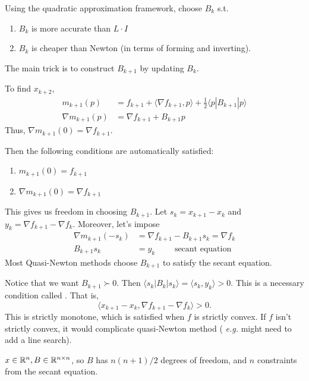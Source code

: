 \documentclass[class=article,crop=false]{standalone}
\begin{document}
\begin{thm}
Using the quadratic approximation framework, choose $ B_k$ s.t. 
\begin{enumerate}[label=(\arabic*)]
	\item $ B_k$ is more accurate than $ L \cdot I$
	\item $ B_k$ is cheaper than Newton (in terms of forming and inverting).
\end{enumerate}
\end{thm}

The main trick is to construct $ B_{k+1}$ by updating $ B_k$.

To find $ x_{k+2}$,
\begin{align*}
	m_{k+1}(p) &= f_{k+1} + \langle \nabla f_{k+1},p \rangle + \frac{1}{2} \langle p|B_{k+1}|p \rangle\\
	\nabla m_{k+1} (p) &= \nabla f_{k+1} + B_{k+1} p  
\end{align*}
Thus, $ \nabla m_{k+1} (0) = \nabla f_{k+1}$.

Then the following conditions are automatically satisfied:
\begin{enumerate}[label=(\arabic*)]
	\item $ m_{k+1} (0) = f_{k+1}$ 
	\item $ \nabla m_{k+1} (0) = \nabla f_{k+1}$
\end{enumerate}
This gives us freedom in choosing $ B_{k+1}$. Let $ s_k = x_{k+1} - x_k$ and $ y_k = \nabla f_{k+1} - \nabla f_k$. Moreover, let's impose
\begin{align*}
	\nabla m_{k+1} (-s_k) &= \nabla f_{k+1} - B_{k+1} s_k = \nabla f_k\\
B_{k+1} s_k &= y_k \qquad \text{ secant equation} 
\end{align*}
Most Quasi-Newton methods choose $ B_{k+1}$ to satisfy the secant equation.

Notice that we want $ B_{k+1} \succ 0$. Then $ \langle s_k|B_k|s_k \rangle = \langle s_k, y_k \rangle >0$. This is a necessary condition called . That is,
		\[
		\langle x_{k+1} - x_k, \nabla f_{k+1} - \nabla f_k \rangle > 0
		.\] 
		This is strictly monotone, which is satisfied when $ f$ is strictly convex. If $ f$ isn't strictly convex, it would complicate quasi-Newton method ( \emph{e.g.} might need to add a line search).

		$ x \in \mathbb{R}^{n}, B \in \mathbb{R}^{n \times n}$, so $ B$ has  $ n(n+1) /2$ degrees of freedom, and $ n$ constraints from the secant equation.
\end{document}
